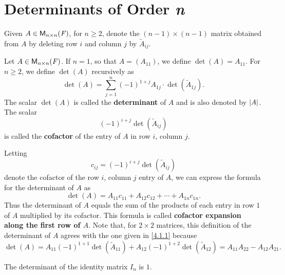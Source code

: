\section{Determinants of Order \textit{n}}\label{sec:4.2}

\begin{defn}\label{4.2.1}
  Given \(A \in \ms[n][n][\F]\), for \(n \geq 2\), denote the \((n - 1) \times (n - 1)\) matrix obtained from \(A\) by deleting row \(i\) and column \(j\) by \(\tilde{A}_{i j}\).
\end{defn}

\begin{defn}\label{4.2.2}
  Let \(A \in \ms[n][n][\F]\).
  If \(n = 1\), so that \(A = (A_{1 1})\), we define \(\det(A) = A_{1 1}\).
  For \(n \geq 2\), we define \(\det(A)\) recursively as
  \[
    \det(A) = \sum_{j = 1}^n (-1)^{1 + j} A_{1 j} \cdot \det(\tilde{A}_{1 j}).
  \]
  The scalar \(\det(A)\) is called the \textbf{determinant} of \(A\) and is also denoted by \(\left\lvert A\right\rvert\).
  The scalar
  \[
    (-1)^{i + j} \det(\tilde{A}_{i j})
  \]
  is called the \textbf{cofactor} of the entry of \(A\) in row \(i\), column \(j\).

  Letting
  \[
    c_{i j} = (-1)^{i + j} \det(\tilde{A}_{i j})
  \]
  denote the cofactor of the row \(i\), column \(j\) entry of \(A\), we can express the formula for the determinant of \(A\) as
  \[
    \det(A) = A_{1 1} c_{1 1} + A_{1 2} c_{1 2} + \cdots + A_{1 n} c_{1 n}.
  \]
  Thus the determinant of \(A\) equals the sum of the products of each entry in row \(1\) of \(A\) multiplied by its cofactor.
  This formula is called \textbf{cofactor expansion along the first row of \(A\)}.
  Note that, for \(2 \times 2\) matrices, this definition of the determinant of \(A\) agrees with the one given in \cref{4.1.1} because
  \[
    \det(A) = A_{1 1} (-1)^{1 + 1} \det(\tilde{A}_{1 1}) + A_{1 2} (-1)^{1 + 2} \det(\tilde{A}_{1 2}) = A_{1 1} A_{2 2} - A_{1 2} A_{2 1}.
  \]
\end{defn}

\begin{eg}\label{4.2.3}
  The determinant of the identity matrix \(I_n\) is \(1\).
\end{eg}

